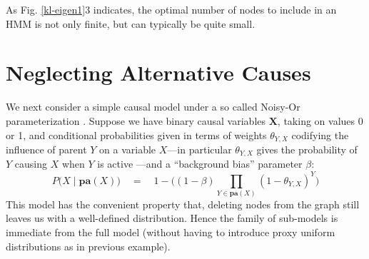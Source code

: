 \documentclass[10pt,letterpaper]{article}
\begin{document}
As Fig. \ref{kl-eigen1}3 indicates, the optimal number of nodes to include in an HMM is not only finite, but can typically be quite small.

\section{Neglecting Alternative Causes}

We next consider a simple causal model under a so called Noisy-Or parameterization \citep{Cheng}. Suppose we have binary causal variables $\textbf{X}$, taking on values 0 or 1, and conditional probabilities given in terms of weights $\theta_{Y,X}$ codifying the influence of parent $Y$ on a variable $X$---in particular $\theta_{Y,X}$ gives the probability of $Y$ causing $X$ when $Y$ is active ---and a ``background bias'' parameter $\beta$: $$P\big(X\mid \textbf{pa}(X)\big) \quad = \quad 1-\Big((1-\beta)\prod_{Y \in \textbf{pa}(X)} (1-\theta_{Y,X})^Y\Big)$$
This model has the convenient property that, deleting nodes from the graph still leaves us with a well-defined distribution. Hence the family of sub-models is immediate from the full model (without having to introduce proxy uniform distributions as in previous example).
\end{document}

